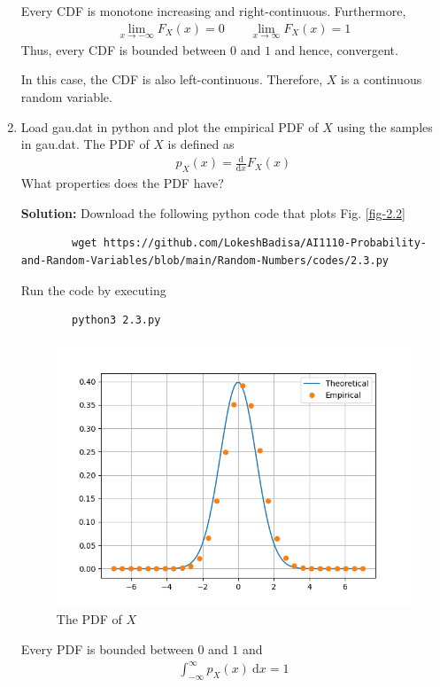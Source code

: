 \documentclass[journal,12pt,twocolumn]{IEEEtran}
\newcommand{\solution}{\noindent \textbf{Solution: }}
\providecommand{\der}[1]{\mathrm{d} #1}
\numberwithin{equation}{section}
\renewcommand\thesection{\arabic{section}}
\begin{document}
\begin{enumerate}[label=\thesection.\arabic*,ref=\thesection.\theenumi]
	Every CDF is monotone increasing and right-continuous. Furthermore,
	\begin{align}
		\lim_{x \to -\infty} F_{X}(x) = 0 \qquad \lim_{x \to \infty} F_{X}(x) = 1
	\end{align}
	Thus, every CDF is bounded between $0$ and $1$ and hence, convergent.
	
	In this case, the CDF is also left-continuous. Therefore, $X$ is a continuous random variable.
	
	\item Load gau.dat in python and plot the empirical PDF of $X$ using the samples in gau.dat. The PDF of $X$ is defined as
	\begin{align}
		p_{X}(x) = \frac{\der{}}{\der{x}}F_{X}(x)
	\end{align}
	What properties does the PDF have?
	
	\solution Download the following python code that plots Fig. \ref{fig-2.2}
	\begin{lstlisting}
		wget https://github.com/LokeshBadisa/AI1110-Probability-and-Random-Variables/blob/main/Random-Numbers/codes/2.3.py
	\end{lstlisting}
	Run the code by executing
	\begin{lstlisting}
		python3 2.3.py
	\end{lstlisting}
	\begin{figure}
		\centering
		\includegraphics[width=\columnwidth]{./figs/2.3.png}
		\caption{The PDF of $X$}
		\label{fig-2.3}
	\end{figure}
	
	Every PDF is bounded between $0$ and $1$ and
	\begin{align}
		\int_{-\infty}^{\infty} p_{X}(x) ~\mathrm{d}x = 1
	\end{align}
	

\end{enumerate}
\end{document}
